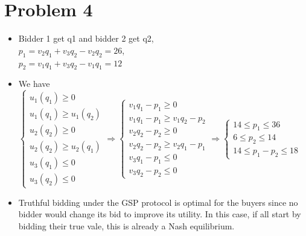\documentclass{article}
\newenvironment{answer}{\par\color{ForestGreen}}{\par}
\begin{document}
\section{Problem 4}
\begin{answer}
  \begin{itemize}
    \item Bidder 1 get q1 and bidder 2 get q2, \\
    $p_1 = v_2q_1 + v_3q_2 - v_2q_2 = 26$, \\
    $p_2 = v_1q_1 + v_3q_2 - v_1q_1 = 12$
    \item We have
    $\begin{cases}
      u_1(q_1) \geq 0 \\
      u_1(q_1) \geq u_1(q_2) \\
      u_2(q_2) \geq 0 \\
      u_2(q_2) \geq u_2(q_1) \\
      u_3(q_1) \leq 0 \\
      u_3(q_2) \leq 0
    \end{cases}
    \Rightarrow
    \begin{cases}
      v_1q_1 - p_1 \geq 0 \\
      v_1q_1 - p_1 \geq v_1q_2 - p_2 \\
      v_2q_2 - p_2 \geq 0 \\
      v_2q_2 - p_2 \geq v_2q_1 - p_1 \\
      v_3q_1 - p_1 \leq 0 \\
      v_3q_2 - p_2 \leq 0
    \end{cases}
    \Rightarrow
    \begin{cases}
      14 \leq  p_1 \leq 36 \\
      6 \leq  p_2 \leq 14 \\
      14 \leq  p_1 - p_2 \leq 18
    \end{cases}$
    \item Truthful bidding under the GSP protocol is optimal for the buyers since no bidder would change its bid to improve its utility.
    In this case, if all start by bidding their true vale, this is already a Nash equilibrium.
  \end{itemize}
\end{answer}
\end{document}
